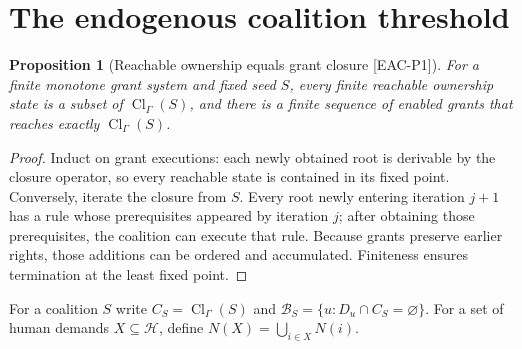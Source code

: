 \documentclass[11pt,a4paper]{article}
\newtheorem{proposition}[theorem]{Proposition}
\theoremstyle{definition}\newtheorem{definition}{Definition}
\newcommand{\Cl}{\operatorname{Cl}}
\newcommand{\Rules}{\Gamma}
\newcommand{\Banks}{\mathcal B}
\newcommand{\Humans}{\mathcal H}
\newcommand{\idtag}[1]{\textnormal{\textsf{[#1]}}}
\begin{document}
\section{The endogenous coalition threshold}
\label{sec:theory}
\begin{proposition}[Reachable ownership equals grant closure \idtag{EAC-P1}]
For a finite monotone grant system and fixed seed $S$, every finite reachable ownership state is a subset of $\Cl_\Rules(S)$, and there is a finite sequence of enabled grants that reaches exactly $\Cl_\Rules(S)$.
\end{proposition}
\begin{proof}
Induct on grant executions: each newly obtained root is derivable by the closure operator, so every reachable state is contained in its fixed point. Conversely, iterate the closure from $S$. Every root newly entering iteration $j+1$ has a rule whose prerequisites appeared by iteration $j$; after obtaining those prerequisites, the coalition can execute that rule. Because grants preserve earlier rights, those additions can be ordered and accumulated. Finiteness ensures termination at the least fixed point.
\end{proof}

For a coalition $S$ write $C_S=\Cl_\Rules(S)$ and $\Banks_S=\{u:D_u\cap C_S=\varnothing\}$. For a set of human demands $X\subseteq\Humans$, define $N(X)=\bigcup_{i\in X}N(i)$.
\end{document}
